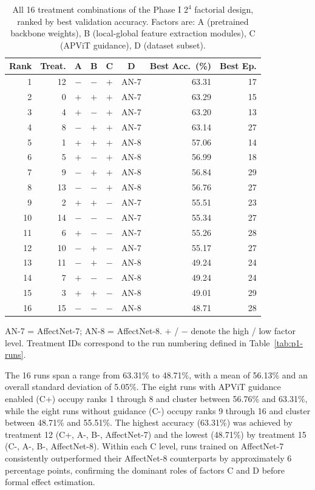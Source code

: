\begin{table}[h!]
    \centering
    \begin{tabular}{@{}rrccccrr@{}}
    \toprule
    \textbf{Rank} & \textbf{Treat.} & \textbf{A} & \textbf{B} & \textbf{C} & \textbf{D} & \textbf{Best Acc.\ (\%)} & \textbf{Best Ep.} \\
    \midrule
    1  & 12 & $-$ & $-$ & $+$ & AN-7 & 63.31 & 17 \\
    2  &  0 & $+$ & $+$ & $+$ & AN-7 & 63.29 & 15 \\
    3  &  4 & $+$ & $-$ & $+$ & AN-7 & 63.20 & 13 \\
    4  &  8 & $-$ & $+$ & $+$ & AN-7 & 63.14 & 27 \\
    5  &  1 & $+$ & $+$ & $+$ & AN-8 & 57.06 & 14 \\
    6  &  5 & $+$ & $-$ & $+$ & AN-8 & 56.99 & 18 \\
    7  &  9 & $-$ & $+$ & $+$ & AN-8 & 56.84 & 29 \\
    8  & 13 & $-$ & $-$ & $+$ & AN-8 & 56.76 & 27 \\
    9  &  2 & $+$ & $+$ & $-$ & AN-7 & 55.51 & 23 \\
    10 & 14 & $-$ & $-$ & $-$ & AN-7 & 55.34 & 27 \\
    11 &  6 & $+$ & $-$ & $-$ & AN-7 & 55.26 & 28 \\
    12 & 10 & $-$ & $+$ & $-$ & AN-7 & 55.17 & 27 \\
    13 & 11 & $-$ & $+$ & $-$ & AN-8 & 49.24 & 24 \\
    14 &  7 & $+$ & $-$ & $-$ & AN-8 & 49.24 & 24 \\
    15 &  3 & $+$ & $+$ & $-$ & AN-8 & 49.01 & 29 \\
    16 & 15 & $-$ & $-$ & $-$ & AN-8 & 48.71 & 28 \\
    \bottomrule
    \end{tabular}
    \smallskip

    \footnotesize{AN-7 = AffectNet-7; AN-8 = AffectNet-8. $+$ / $-$ denote the high / low factor level. Treatment IDs correspond to the run numbering defined in Table~\ref{tab:p1-runs}.}
    \caption[Phase I factorial results ranked by accuracy]{All 16 treatment combinations of the Phase I $2^4$ factorial design, ranked by best validation accuracy. Factors are: A (pretrained backbone weights), B (local-global feature extraction modules), C (APViT guidance), D (dataset subset).}
    \label{tab:results-p1-ranked}
\end{table}

The 16 runs span a range from 63.31\% to 48.71\%, with a mean of 56.13\% and an overall standard deviation of 5.05\%. The eight runs with APViT guidance enabled (C+) occupy ranks 1 through 8 and cluster between 56.76\% and 63.31\%, while the eight runs without guidance (C-) occupy ranks 9 through 16 and cluster between 48.71\% and 55.51\%. The highest accuracy (63.31\%) was achieved by treatment 12 (C+, A-, B-, AffectNet-7) and the lowest (48.71\%) by treatment 15 (C-, A-, B-, AffectNet-8). Within each C level, runs trained on AffectNet-7 consistently outperformed their AffectNet-8 counterparts by approximately 6 percentage points, confirming the dominant roles of factors C and D before formal effect estimation.

